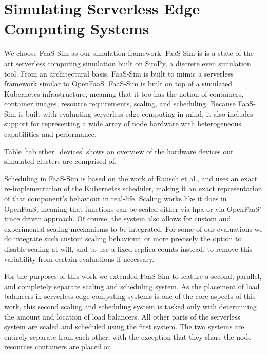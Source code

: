 \section{Simulating Serverless Edge Computing Systems}
We choose FaaS-Sim\cite{faas-sim-github} as our simulation framework.
FaaS-Sim is is a state of the art serverless computing simulation built on SimPy, %
a discrete even simulation tool.
From an architectural basis, FaaS-Sim is built to mimic a serverless framework similar to OpenFaaS.
FaaS-Sim is built on top of a simulated Kubernetes infrastructure, meaning that it too has the notion of containers, container images, resource requirements, scaling, and scheduling.
Because FaaS-Sim is built with evaluating serverless edge computing in mind, it also includes support for representing a wide array of node hardware with heterogeneous capabilities and performance.


Table \ref{tab:ether_devices} shows an overview of the hardware devices our simulated clusters are comprised of.

Scheduling in FaaS-Sim is based on the work of Rausch et al.\cite{skippy}, and uses an exact re-implementation of the Kubernetes scheduler, making it an exact representation of that component's behaviour in real-life.
Scaling works like it does in OpenFaaS, meaning that functions can be scaled either via \gls{hpa} or via OpenFaaS' trace driven approach.
Of course, the system also allows for custom and experimental scaling mechanisms to be integrated.
For some of our evaluations we do integrate such custom scaling behaviour, or more precisely the option to disable scaling at will, and to use a fixed replica counts instead, to remove this variability from certain evaluations if necessary.

For the purposes of this work we extended FaaS-Sim to feature a second, parallel, and completely separate scaling and scheduling system.
As the placement of load balancers in serverless edge computing systems is one of the core aspects of this work, this second scaling and scheduling system is tasked only with determining the amount and location of load balancers.
All other parts of the serverless system are scaled and scheduled using the first system.
The two systems are entirely separate from each other, with the exception that they share the node resources containers are placed on.

